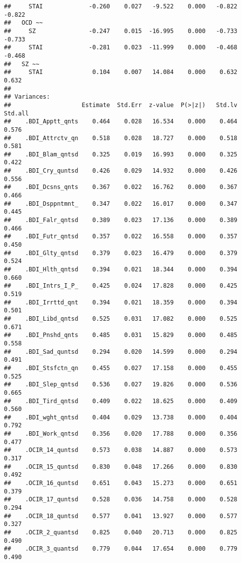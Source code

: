 \documentclass[]{article}
\begin{document}
\begin{verbatim}
##     STAI             -0.260    0.027   -9.522    0.000   -0.822   -0.822
##   OCD ~~                                                                
##     SZ               -0.247    0.015  -16.995    0.000   -0.733   -0.733
##     STAI             -0.281    0.023  -11.999    0.000   -0.468   -0.468
##   SZ ~~                                                                 
##     STAI              0.104    0.007   14.084    0.000    0.632    0.632
## 
## Variances:
##                    Estimate  Std.Err  z-value  P(>|z|)   Std.lv  Std.all
##    .BDI_Apptt_qnts    0.464    0.028   16.534    0.000    0.464    0.576
##    .BDI_Attrctv_qn    0.518    0.028   18.727    0.000    0.518    0.581
##    .BDI_Blam_qntsd    0.325    0.019   16.993    0.000    0.325    0.422
##    .BDI_Cry_quntsd    0.426    0.029   14.932    0.000    0.426    0.556
##    .BDI_Dcsns_qnts    0.367    0.022   16.762    0.000    0.367    0.466
##    .BDI_Dsppntmnt_    0.347    0.022   16.017    0.000    0.347    0.445
##    .BDI_Falr_qntsd    0.389    0.023   17.136    0.000    0.389    0.466
##    .BDI_Futr_qntsd    0.357    0.022   16.558    0.000    0.357    0.450
##    .BDI_Glty_qntsd    0.379    0.023   16.479    0.000    0.379    0.524
##    .BDI_Hlth_qntsd    0.394    0.021   18.344    0.000    0.394    0.660
##    .BDI_Intrs_I_P_    0.425    0.024   17.828    0.000    0.425    0.519
##    .BDI_Irrttd_qnt    0.394    0.021   18.359    0.000    0.394    0.501
##    .BDI_Libd_qntsd    0.525    0.031   17.082    0.000    0.525    0.671
##    .BDI_Pnshd_qnts    0.485    0.031   15.829    0.000    0.485    0.558
##    .BDI_Sad_quntsd    0.294    0.020   14.599    0.000    0.294    0.491
##    .BDI_Stsfctn_qn    0.455    0.027   17.158    0.000    0.455    0.525
##    .BDI_Slep_qntsd    0.536    0.027   19.826    0.000    0.536    0.665
##    .BDI_Tird_qntsd    0.409    0.022   18.625    0.000    0.409    0.560
##    .BDI_wght_qntsd    0.404    0.029   13.738    0.000    0.404    0.792
##    .BDI_Work_qntsd    0.356    0.020   17.788    0.000    0.356    0.477
##    .OCIR_14_quntsd    0.573    0.038   14.887    0.000    0.573    0.317
##    .OCIR_15_quntsd    0.830    0.048   17.266    0.000    0.830    0.492
##    .OCIR_16_quntsd    0.651    0.043   15.273    0.000    0.651    0.379
##    .OCIR_17_quntsd    0.528    0.036   14.758    0.000    0.528    0.294
##    .OCIR_18_quntsd    0.577    0.041   13.927    0.000    0.577    0.327
##    .OCIR_2_quantsd    0.825    0.040   20.713    0.000    0.825    0.490
##    .OCIR_3_quantsd    0.779    0.044   17.654    0.000    0.779    0.490

\end{verbatim}
\end{document}

